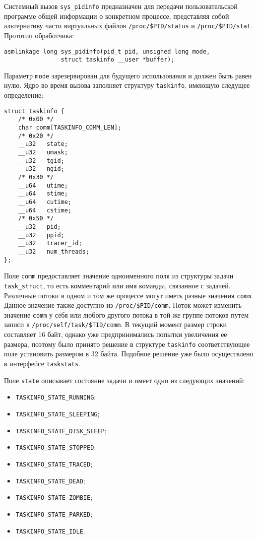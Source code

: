 Системный вызов \texttt{sys\_pidinfo} предназначен для передачи пользовательской
программе общей информации о конкретном процессе, представляя собой альтернативу
части виртуальных файлов \texttt{/proc/\$PID/status} и \texttt{/proc/\$PID/stat}. Прототип
обработчика:

\medskip
\begin{lstlisting}[style=cstyle]
asmlinkage long sys_pidinfo(pid_t pid, unsigned long mode,
			    struct taskinfo __user *buffer);
\end{lstlisting}
\medskip

Параметр \texttt{mode} зарезервирован для будущего использования и должен быть
равен нулю. Ядро во время вызова заполняет структуру \texttt{taskinfo}, имеющую
следущее определение:

\medskip
\begin{lstlisting}[style=cstyle]
struct taskinfo {
	/* 0x00 */
	char comm[TASKINFO_COMM_LEN];
	/* 0x20 */
	__u32	state;
	__u32	umask;
	__u32	tgid;
	__u32	ngid;
	/* 0x30 */
	__u64	utime;
	__u64	stime;
	__u64	cutime;
	__u64	cstime;
	/* 0x50 */
	__u32	pid;
	__u32	ppid;
	__u32	tracer_id;
	__u32	num_threads;
};
\end{lstlisting}
\medskip

Поле \texttt{comm} предоставляет значение одноименного поля из структуры задачи
\texttt{task\_struct}, то есть комментарий или имя команды, связанное с
задачей. Различные потоки в одном и том же процессе могут иметь разные значения
\texttt{comm}. Данное значение также доступно из
\texttt{/proc/\$PID/comm}. Поток может изменить значение \texttt{comm} у себя
или любого другого потока в той же группе потоков путем записи в
\texttt{/proc/self/task/\$TID/comm}. В текущий момент размер строки составляет
16 байт, однако уже предпринимались попытки увеличения ее размера, поэтому было
принято решение в структуре \texttt{taskinfo} соответствующее поле установить
размером в 32 байта. Подобное решение уже было осуществлено в интерфейсе
\texttt{taskstats}.

Поле \texttt{state} описывает состояние задачи и имеет одно из следующих
значений:
\begin{itemize}
\item \texttt{TASKINFO\_STATE\_RUNNING};
\item \texttt{TASKINFO\_STATE\_SLEEPING};
\item \texttt{TASKINFO\_STATE\_DISK\_SLEEP};
\item \texttt{TASKINFO\_STATE\_STOPPED};
\item \texttt{TASKINFO\_STATE\_TRACED};
\item \texttt{TASKINFO\_STATE\_DEAD};
\item \texttt{TASKINFO\_STATE\_ZOMBIE};
\item \texttt{TASKINFO\_STATE\_PARKED};
\item \texttt{TASKINFO\_STATE\_IDLE}.
\end{itemize}

